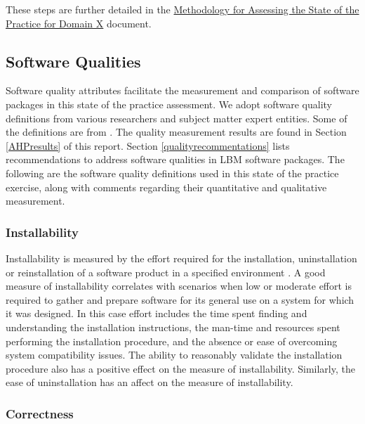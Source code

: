 \documentclass[12pt, notitlepage]{article}
\begin{document}
These steps are further detailed in the \href{https://github.com/smiths/AIMSS/blob/master/StateOfPractice/Methodology/Methodology.pdf}{Methodology for Assessing the State of the Practice for Domain X} document.

\subsection{Software Qualities}\label{softwarequalities}

Software quality attributes facilitate the measurement and comparison of software packages in this state of the practice assessment. We adopt software quality definitions from various researchers and subject matter expert entities. Some of the definitions are from \cite{Smithetal2020}. The quality measurement results are found in Section \ref{AHPresults} of this report. Section \ref{qualityrecommentations} lists recommendations to address software qualities in LBM software packages. The following are the software quality definitions used in this state of the practice exercise, along with comments regarding their quantitative and qualitative measurement.

\subsubsection{Installability} 

Installability is measured by the effort required for the installation, uninstallation or reinstallation of a software product in a specified
environment \citep{ISO/IEC25010} \citep{lenhard2013measuring}. A good measure of installability correlates with scenarios when low or moderate effort is required to gather and prepare software for its general use on a system for which it was designed. In this case effort includes the time spent finding and understanding the installation instructions, the man-time and resources spent performing the installation procedure, and the absence or ease of overcoming system compatibility issues. The ability to reasonably validate the installation procedure also has a positive effect on the measure of installability. Similarly, the ease of uninstallation has an affect on the measure of installability. 

\subsubsection{Correctness}
\end{document}
